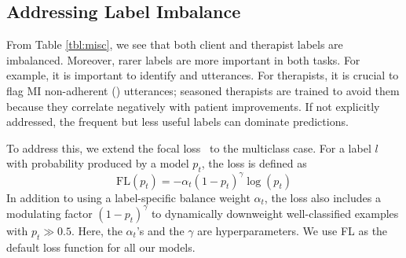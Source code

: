 \subsection{Addressing Label Imbalance}
\label{ssec:focal_loss}
From Table \ref{tbl:misc}, we see that both client and therapist
labels are imbalanced. Moreover, rarer labels are more important in
both tasks. For example, it is important to identify \CHANGE and
\SUSTAIN utterances. For therapists, it is crucial to flag MI
non-adherent (\MIN) utterances; seasoned therapists are trained to
avoid them because they correlate negatively with patient
improvements. If not explicitly addressed, the frequent but less
useful labels can dominate predictions.


To address this, we extend the focal loss~\cite[FL][]{lin2017focal}
to the multiclass case. For a label $l$ with probability produced by
a model $p_t$, the loss is defined as 
\begin{equation}
 \label{eq:focal}
\text{FL}(p_{t}) = -\alpha_{t} {(1 -p_{t})}^{\gamma} \log(p_{t})
\end{equation}
In addition to using a label-specific balance weight $\alpha_t$, the
loss also includes a modulating factor ${(1-p_{t})}^{\gamma}$ to
dynamically downweight well-classified examples with
$p_{t}\gg0.5$. Here, the $\alpha_t$'s and the $\gamma$ are
hyperparameters. We use FL as the default loss function for all our
models.



